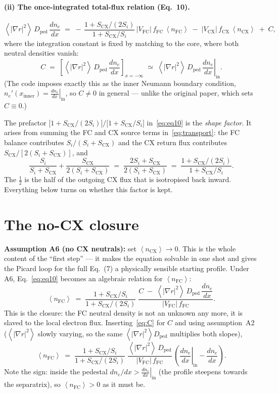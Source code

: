 \documentclass[11pt]{article}
\renewcommand{\ne}{n_{e}}  %
\newcommand{\nfc}{n_{\mathrm{FC}}}
\newcommand{\ncx}{n_{\mathrm{CX}}}
\newcommand{\Vfc}{\lvert V_{\mathrm{FC}}\rvert}
\newcommand{\Vcx}{\lvert V_{\mathrm{CX}}\rvert}
\newcommand{\Si}{S_{i}}
\newcommand{\Scx}{S_{\mathrm{CX}}}
\newcommand{\Dped}{D_{\mathrm{ped}}}
\newcommand{\fFC}{f_{\mathrm{FC}}}
\newcommand{\fCX}{f_{\mathrm{CX}}}
\newcommand{\fsa}[1]{\left\langle #1 \right\rangle}
\newcommand{\gradrsq}{\fsa{|\nabla r|^{2}}}
\newcommand{\neginf}{x=-\infty}
\newcommand{\dnein}{\left.\frac{d\ne}{dx}\right|_{\mathrm{in}}}
\newcommand{\xin}{x_{\mathrm{inner}}}
\begin{document}
\paragraph{(ii) The once-integrated total-flux relation (Eq.~10).}
\begin{equation}
  \gradrsq\,\Dped\,\frac{d\ne}{dx}
    \;=\;
    -\,\frac{1+\Scx/(2\Si)}{1+\Scx/\Si}\,\Vfc\,\fFC\,\fsa{\nfc}
    \;-\; \Vcx\,\fCX\,\fsa{\ncx}
    \;+\; C,
  \label{eq:eq10}
\end{equation}
where the integration constant is fixed by matching to the core, where both
neutral densities vanish:
\begin{equation}
  C \;=\; \left[\gradrsq\,\Dped\,\frac{d\ne}{dx}\right]_{\neginf}
      \;\simeq\; \gradrsq\,\Dped\,\dnein .
  \label{eq:C}
\end{equation}
(The code imposes exactly this as the inner Neumann boundary condition,
$\ne'(\xin) = \dnein$, so $C\neq 0$ in general --- unlike the original
paper, which sets $C\equiv0$.)

The prefactor $\bigl[1+\Scx/(2\Si)\bigr]/\bigl[1+\Scx/\Si\bigr]$
in~\eqref{eq:eq10} is the \emph{shape factor}.  It arises from summing the
FC and CX source terms in~\eqref{eq:transport}: the FC balance contributes
$\Si/(\Si+\Scx)$ and the CX return flux contributes $\Scx/[2(\Si+\Scx)]$,
and
\begin{equation}
  \frac{\Si}{\Si+\Scx} + \frac{\Scx}{2(\Si+\Scx)}
  \;=\; \frac{2\Si+\Scx}{2(\Si+\Scx)}
  \;=\; \frac{1+\Scx/(2\Si)}{1+\Scx/\Si}.
  \label{eq:shape}
\end{equation}
The $\tfrac12$ is the half of the outgoing CX flux that is isotropised back
inward.  Everything below turns on whether this factor is kept.

\section{The no-CX closure}
\label{sec:closure}

\textbf{Assumption A6 (no CX neutrals):} set $\fsa{\ncx}\to0$.  This is the
whole content of the ``first step'' --- it makes the equation solvable in
one shot and gives the Picard loop for the full Eq.~(7) a physically
sensible starting profile.  Under A6, Eq.~\eqref{eq:eq10} becomes an
algebraic relation for $\fsa{\nfc}$:
\begin{equation}
  \fsa{\nfc}
    \;=\; \frac{1+\Scx/\Si}{1+\Scx/(2\Si)}\;
          \frac{C \;-\; \gradrsq\,\Dped\,\dfrac{d\ne}{dx}}{\Vfc\,\fFC}.
  \label{eq:closure}
\end{equation}
This is the closure: the FC neutral density is not an unknown any more, it
is slaved to the local electron flux.  Inserting~\eqref{eq:C} for $C$ and
using assumption~A2 ($\gradrsq$ slowly varying, so the same $\gradrsq\Dped$
multiplies both slopes),
\begin{equation}
  \fsa{\nfc}
    \;=\; \frac{1+\Scx/\Si}{1+\Scx/(2\Si)}\;
          \frac{\gradrsq\,\Dped}{\Vfc\,\fFC}\,
          \left(\dnein - \frac{d\ne}{dx}\right).
  \label{eq:closure2}
\end{equation}
Note the sign: inside the pedestal $d\ne/dx > \dnein$ (the profile steepens
towards the separatrix), so $\fsa{\nfc}>0$ as it must be.
\end{document}
